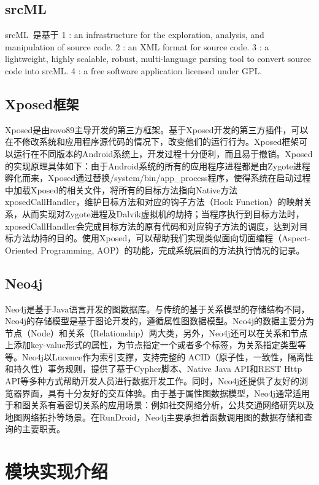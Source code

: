 \subsection{srcML}
srcML~\cite{collard2013srcml}是基于
1 : an infrastructure for the exploration, analysis, and manipulation of source code.
2 : an XML format for source code.
3 : a lightweight, highly scalable, robust, multi-language parsing tool to convert source code into srcML.
4 : a free software application licensed under GPL.


\subsection{Xposed框架}
Xposed是由rovo89主导开发的第三方框架。基于Xposed开发的第三方插件，可以在不修改系统和应用程序源代码的情况下，改变他们的运行行为。Xposed框架可以运行在不同版本的Android系统上，开发过程十分便利，而且易于撤销。Xposed的实现原理具体如下：由于Android系统的所有的应用程序进程都是由Zygote进程孵化而来，Xposed通过替换/system/bin/app\_process程序，使得系统在启动过程中加载Xposed的相关文件，将所有的目标方法指向Native方法xposedCallHandler，维护目标方法和对应的钩子方法（Hook Function）的映射关系，从而实现对Zygote进程及Dalvik虚拟机的劫持；当程序执行到目标方法时，xposedCallHandler会完成目标方法的原有代码和对应钩子方法的调度，达到对目标方法劫持的目的。使用Xposed，可以帮助我们实现类似面向切面编程（Aspect-Oriented Programming, AOP）的功能，完成系统层面的方法执行情况的记录。
\subsection{Neo4j}
Neo4j是基于Java语言开发的图数据库。与传统的基于关系模型的存储结构不同，Neo4j的存储模型是基于图论开发的，遵循属性图数据模型。Neo4j的数据主要分为节点（Node）和关系（Relationship）两大类，另外，Neo4j还可以在关系和节点上添加key-value形式的属性，为节点指定一个或者多个标签，为关系指定类型等等。Neo4j以Lucence作为索引支撑，支持完整的 ACID（原子性，一致性，隔离性和持久性）事务规则，提供了基于Cypher脚本、Native Java API和REST Http API等多种方式帮助开发人员进行数据开发工作。同时，Neo4j还提供了友好的浏览器界面，具有十分友好的交互体验。由于基于属性图数据模型，Neo4j通常适用于和图关系有着密切关系的应用场景：例如社交网络分析，公共交通网络研究以及地图网络拓扑等场景。在RunDroid，Neo4j主要承担着函数调用图的数据存储和查询的主要职责。

\section{模块实现介绍}


